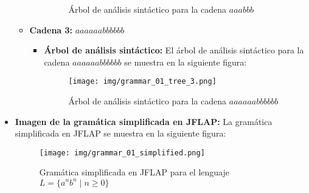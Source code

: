\documentclass[11pt]{report}
\begin{document}
\begin{itemize}
\begin{itemize}
\begin{itemize}
\begin{figure}[H]
        \caption{Árbol de análisis sintáctico para la cadena $aaabbb$}
        \label{fig:arbol2}
      \end{figure}
    \end{itemize}
    \item \textbf{Cadena 3:} $aaaaaabbbbbb$
    \begin{itemize}
      \item \textbf{Árbol de análisis sintáctico:} El árbol de análisis sintáctico para la cadena $aaaaaabbbbbb$ se muestra en la siguiente figura:
      \begin{figure}[H]
        \centering
        \texttt{[image: img/grammar\_01\_tree\_3.png]}
        \caption{Árbol de análisis sintáctico para la cadena $aaaaaabbbbbb$}
        \label{fig:arbol3}
      \end{figure}
    \end{itemize}
  \end{itemize}
  \item \textbf{Imagen de la gramática simplificada en JFLAP:} La gramática simplificada en JFLAP se muestra en la siguiente figura:
  \begin{figure}[H]
    \centering
    \texttt{[image: img/grammar\_01\_simplified.png]}
    \caption{Gramática simplificada en JFLAP para el lenguaje $L = \{a^n b^n \mid n \geq 0\}$}
    \label{fig:gramatica1_simplified}
  \end{figure}
\end{itemize}

\newpage

\end{document}
